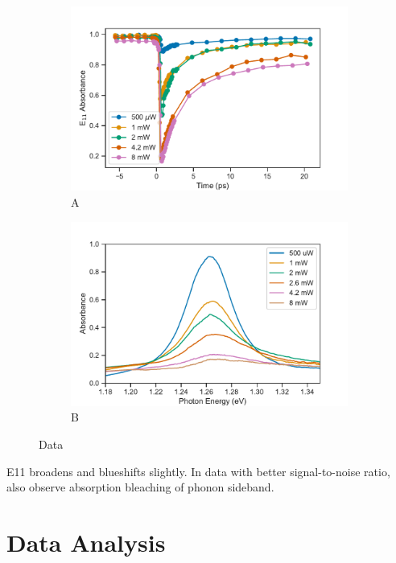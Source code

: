 \begin{figure}[H]
	\centering
	\begin{subfigure}{0.46\textwidth}
		\centering
		\includegraphics[scale=0.55]{images/chapter_my_data/absorbance_dynamics_E11}
		\caption{A}
	\end{subfigure}
	\qquad
	\centering
	\begin{subfigure}{0.46\textwidth}
		\centering
		\includegraphics[scale=0.55]{images/chapter_my_data/peak_abs_vs_pump}
		\caption{B}
	\end{subfigure}
	\caption{Data}
\end{figure}

E11 broadens and blueshifts slightly. In data with better signal-to-noise ratio, also observe absorption bleaching of phonon sideband. 

\section{Data Analysis}

